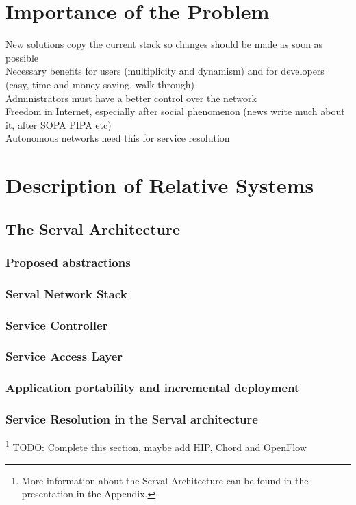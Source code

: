\documentclass[12pt,a4paper,oneside]{article}
\begin{document}
\newpage
\section{Importance of the Problem}
New solutions copy the current stack so changes should be made as soon as possible
\\Necessary benefits for users (multiplicity and dynamism) and for developers (easy, time and money saving, walk through)
\\Administrators must have a better control over the network
\\Freedom in Internet, especially after social phenomenon (news write much about it, after SOPA PIPA etc)
\\Autonomous networks need this for service resolution


\newpage
\section{Description of Relative Systems}
\subsection{The Serval Architecture}
\subsubsection{Proposed abstractions}
\subsubsection{Serval Network Stack}
\subsubsection*{Service Controller}
\subsubsection*{Service Access Layer}
\subsubsection{Application portability and incremental deployment}
\subsubsection{Service Resolution in the Serval architecture}
\footnote{More information about the Serval Architecture can be found in the presentation in the Appendix.}
TODO: Complete this section, maybe add HIP, Chord and OpenFlow
\end{document}
